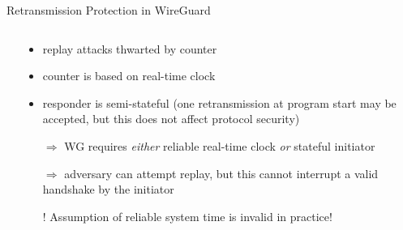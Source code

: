 \begin{frame}[T]{Retransmission Protection in WireGuard}
\begin{columns}[fullwidth,T]
  \begin{column}{.5\linewidth}
  \end{column}
  \begin{column}{.46\linewidth}
  \small
    \begin{itemize}
      \item replay attacks thwarted by counter
      \item counter is based on real-time clock
      \item responder is semi-stateful (one retransmission at program start may be accepted, but this does not affect protocol security)
      \item[$\Rightarrow$]
         WG requires \emph{either} reliable real-time clock \emph{or} stateful initiator
      \item[$\Rightarrow$]
        adversary can attempt replay, but this cannot interrupt a valid handshake by the initiator
      \item[!] Assumption of reliable system time is invalid in practice!
    \end{itemize}
  \end{column}
\end{columns}
\end{frame}




